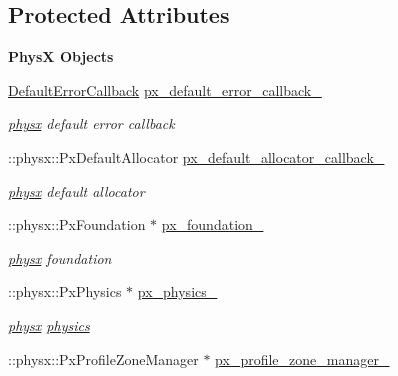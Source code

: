 \subsection*{Protected Attributes}
\begin{Indent}{\bf PhysX Objects}\par
{\em \label{_amgrp5dcec0622931609ebc9147725ef87cd9}
 }\begin{DoxyCompactItemize}
\item 
\hyperlink{classDefaultErrorCallback}{DefaultErrorCallback} \hyperlink{classnebula_1_1content_1_1physics_1_1physx_1_1base_a6efc236e04cd382bb2725346ab1b782c}{px\_\-default\_\-error\_\-callback\_\-}
\begin{DoxyCompactList}\small\item\em \hyperlink{namespacenebula_1_1content_1_1physics_1_1physx}{physx} default error callback \item\end{DoxyCompactList}\item 
::physx::PxDefaultAllocator \hyperlink{classnebula_1_1content_1_1physics_1_1physx_1_1base_a96d34b7d39992a17aaea21c6fa961297}{px\_\-default\_\-allocator\_\-callback\_\-}
\begin{DoxyCompactList}\small\item\em \hyperlink{namespacenebula_1_1content_1_1physics_1_1physx}{physx} default allocator \item\end{DoxyCompactList}\item 
::physx::PxFoundation $\ast$ \hyperlink{classnebula_1_1content_1_1physics_1_1physx_1_1base_a4faae8c31e70ede63e29fbecc8b7303b}{px\_\-foundation\_\-}
\begin{DoxyCompactList}\small\item\em \hyperlink{namespacenebula_1_1content_1_1physics_1_1physx}{physx} foundation \item\end{DoxyCompactList}\item 
::physx::PxPhysics $\ast$ \hyperlink{classnebula_1_1content_1_1physics_1_1physx_1_1base_aa8569529e7ba22a5fe20bb7cde8e7b7e}{px\_\-physics\_\-}
\begin{DoxyCompactList}\small\item\em \hyperlink{namespacenebula_1_1content_1_1physics_1_1physx}{physx} \hyperlink{namespacenebula_1_1content_1_1physics}{physics} \item\end{DoxyCompactList}\item 
::physx::PxProfileZoneManager $\ast$ \hyperlink{classnebula_1_1content_1_1physics_1_1physx_1_1base_af07122412b147ba1a51c6d71db55a750}{px\_\-profile\_\-zone\_\-manager\_\-}

\end{DoxyCompactItemize}
\end{Indent}
